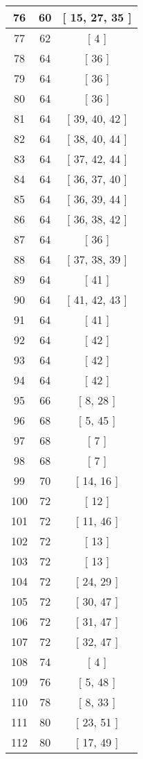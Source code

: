 \begin{center}
\begin{longtable}[H]{|| c c c ||}
\\\hline
76 & 60 & [ 15, 27, 35 ]
\\\hline
77 & 62 & [ 4 ]
\\\hline
78 & 64 & [ 36 ]
\\\hline
79 & 64 & [ 36 ]
\\\hline
80 & 64 & [ 36 ]
\\\hline
81 & 64 & [ 39, 40, 42 ]
\\\hline
82 & 64 & [ 38, 40, 44 ]
\\\hline
83 & 64 & [ 37, 42, 44 ]
\\\hline
84 & 64 & [ 36, 37, 40 ]
\\\hline
85 & 64 & [ 36, 39, 44 ]
\\\hline
86 & 64 & [ 36, 38, 42 ]
\\\hline
87 & 64 & [ 36 ]
\\\hline
88 & 64 & [ 37, 38, 39 ]
\\\hline
89 & 64 & [ 41 ]
\\\hline
90 & 64 & [ 41, 42, 43 ]
\\\hline
91 & 64 & [ 41 ]
\\\hline
92 & 64 & [ 42 ]
\\\hline
93 & 64 & [ 42 ]
\\\hline
94 & 64 & [ 42 ]
\\\hline
95 & 66 & [ 8, 28 ]
\\\hline
96 & 68 & [ 5, 45 ]
\\\hline
97 & 68 & [ 7 ]
\\\hline
98 & 68 & [ 7 ]
\\\hline
99 & 70 & [ 14, 16 ]
\\\hline
100 & 72 & [ 12 ]
\\\hline
101 & 72 & [ 11, 46 ]
\\\hline
102 & 72 & [ 13 ]
\\\hline
103 & 72 & [ 13 ]
\\\hline
104 & 72 & [ 24, 29 ]
\\\hline
105 & 72 & [ 30, 47 ]
\\\hline
106 & 72 & [ 31, 47 ]
\\\hline
107 & 72 & [ 32, 47 ]
\\\hline
108 & 74 & [ 4 ]
\\\hline
109 & 76 & [ 5, 48 ]
\\\hline
110 & 78 & [ 8, 33 ]
\\\hline
111 & 80 & [ 23, 51 ]
\\\hline
112 & 80 & [ 17, 49 ]
\\\hline

\end{longtable}
\end{center}
